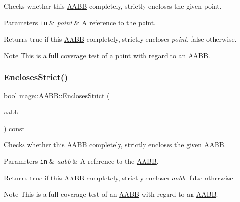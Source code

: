 Checks whether this \mbox{\hyperlink{classmage_1_1_a_a_b_b}{A\+A\+BB}} completely, strictly encloses the given point.


\begin{DoxyParams}[1]{Parameters}
\mbox{\tt in}  & {\em point} & A reference to the point. \\
\hline
\end{DoxyParams}
\begin{DoxyReturn}{Returns}
{\ttfamily true} if this \mbox{\hyperlink{classmage_1_1_a_a_b_b}{A\+A\+BB}} completely, strictly encloses {\itshape point}. {\ttfamily false} otherwise. 
\end{DoxyReturn}
\begin{DoxyNote}{Note}
This is a full coverage test of a point with regard to an \mbox{\hyperlink{classmage_1_1_a_a_b_b}{A\+A\+BB}}. 
\end{DoxyNote}
\mbox{\label{classmage_1_1_a_a_b_b_af037df0800e1e8c3564363f154c2424a}} 
\subsubsection{\texorpdfstring{Encloses\+Strict()}{EnclosesStrict()}\hspace{0.1cm}{\footnotesize\ttfamily [3/4]}}
{\footnotesize\ttfamily bool mage\+::\+A\+A\+B\+B\+::\+Encloses\+Strict (\begin{DoxyParamCaption}\item[{const \mbox{\hyperlink{classmage_1_1_a_a_b_b}{A\+A\+BB}} \&}]{aabb }\end{DoxyParamCaption}) const\hspace{0.3cm}{\ttfamily [noexcept]}}

Checks whether this \mbox{\hyperlink{classmage_1_1_a_a_b_b}{A\+A\+BB}} completely, strictly encloses the given \mbox{\hyperlink{classmage_1_1_a_a_b_b}{A\+A\+BB}}.


\begin{DoxyParams}[1]{Parameters}
\mbox{\tt in}  & {\em aabb} & A reference to the \mbox{\hyperlink{classmage_1_1_a_a_b_b}{A\+A\+BB}}. \\
\hline
\end{DoxyParams}
\begin{DoxyReturn}{Returns}
{\ttfamily true} if this \mbox{\hyperlink{classmage_1_1_a_a_b_b}{A\+A\+BB}} completely, strictly encloses {\itshape aabb}. {\ttfamily false} otherwise. 
\end{DoxyReturn}
\begin{DoxyNote}{Note}
This is a full coverage test of an \mbox{\hyperlink{classmage_1_1_a_a_b_b}{A\+A\+BB}} with regard to an \mbox{\hyperlink{classmage_1_1_a_a_b_b}{A\+A\+BB}}. 
\end{DoxyNote}
\mbox{\label{classmage_1_1_a_a_b_b_a463390d29cc113880fc259d1db8b1eda}} 
